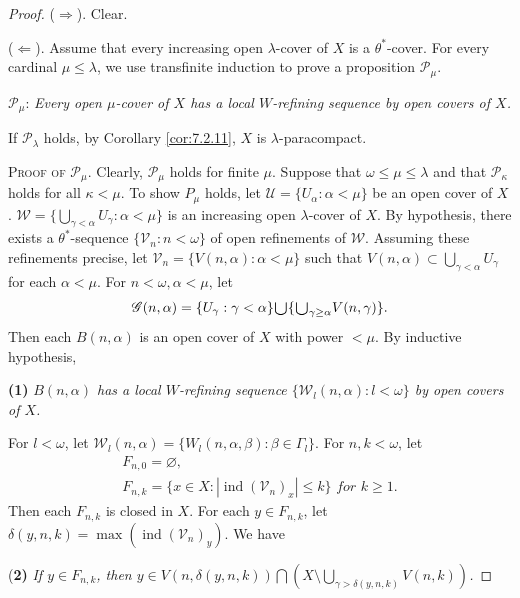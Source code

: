 \documentclass[jisng7iii.tex]{subfiles}
\begin{document}
\begin{proof}
 ($\Rightarrow$). Clear.

 ($\Leftarrow$). Assume that every increasing open $\lambda$-cover of $X$ 
 is a $\theta^*$-cover. 
 For every cardinal $\mu \le \lambda$,
 we use transfinite induction to prove a proposition  $\mathcal{P}_\mu$.
 
 $\mathcal{P}_{\mu}$: \textit{Every open $\mu$-cover of 
 $X$ has a local $W$-refining sequence by open covers of $X$.}
 
If $\mathcal{P}_{\lambda}$ holds, by Corollary \ref{cor:7.2.11},
$X$ is $\lambda$-paracompact.

\noindent \textsc{Proof of $\mathcal{P}_{\mu}$}. Clearly, $\mathcal{P}_{\mu}$ holds for finite  $\mu$.
Suppose that $\omega\le\mu\le\lambda$ and that
$\mathcal{P}_{\kappa}$ holds for all $\kappa < \mu$. To show $P_{\mu}$ holds, 
let $\mathscr{U} = \{U_\alpha: \alpha < \mu\}$ be an open cover of $X$. 
$\mathscr{W} = \{\bigcup_{\gamma < \alpha}U_{\gamma}: \alpha < \mu\}$ is 
an increasing open $\lambda$-cover of $X$.
By hypothesis, there exists a $\theta^*$-sequence 
$\{\mathscr{V}_n:n<\omega\}$ of open refinements of $\mathscr{W}$. 
Assuming these refinements precise, let $\mathscr{V}_n= \{V(n, \alpha): \alpha < \mu \}$ such that 
$V(n, \alpha)\subset \bigcup_{\gamma < \alpha}U_\gamma$ for each $\alpha < \mu$.
For $n < \omega, \alpha < \mu$, let 
$$\mathscr{G}(n, \alpha) = 
\{U_\gamma: \gamma <\alpha\} \raisebox{-2pt}{\scalebox{1.5}{$\cup$}}
\{\raisebox{-2pt}{\scalebox{1.5}{$\cup$}}_{\gamma\ge \alpha}V(n, \gamma)\}.$$
Then each $B(n, \alpha)$ is an open cover of $X$ with power $< \mu$.
By inductive hypothesis, 

\textbf{(1)} \textit{$B(n, \alpha)$ has a  local $W$-refining sequence 
$\{\mathscr{W}_l(n, \alpha): l < \omega\}$ by open covers of $X$.}

\noindent For $l < \omega$, let $\mathscr{W}_l(n, \alpha) = \{W_l(n, \alpha, \beta): \beta \in \Gamma_l\}$. For $n, k < \omega$, let
\begin{gather*}
	F_{n,0}=\varnothing, \\
	F_{n,k}=\{x\in X: |\operatorname{ind}(\mathscr{V}_n)_x| \le k\}\textit{ for } k \ge 1.
\end{gather*}
Then each $F_{n, k}$ is closed in $X$. For each $y\in F_{n, k}$, let 
$\delta(y, n, k) = \max(\operatorname{ind}(\mathscr{V}_n)_y)$.
We have 

(\textbf{2)} \textit{If $y \in F_{n, k}$, then $y\in V(n, \delta(y, n, k))
\bigcap (X\setminus\bigcup_{\gamma> \delta(y, n, k)}V(n,k))$.}


\end{proof}
\end{document}
